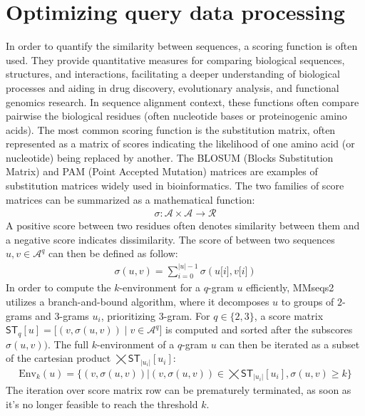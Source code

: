 \documentclass[twoside,a4paper,bsc]{master}
\newcommand{\Qgram}[1]{\(#1\)-gram}
\newcommand{\Subchar}[2]{#1\lbrack #2\rbrack}
\newcommand{\Scoretablename}[0]{\mathsf{ST}}
\newcommand{\Scoretable}[2]{\Scoretablename_{#1}[#2]}
\newcommand{\Alpha}[0]{\mathcal{A}}
\begin{document}
\section{Optimizing query data processing}
In order to quantify the similarity between sequences, a scoring function
is often used. They provide quantitative measures for comparing biological
sequences, structures, and interactions, facilitating a deeper
understanding of biological processes and aiding in drug discovery,
evolutionary analysis, and functional genomics research. In sequence
alignment context, these functions often compare pairwise the biological
residues (often nucleotide bases or proteinogenic amino acids). The most
common scoring function is the substitution matrix, often represented as a
matrix of scores indicating the likelihood of one amino acid (or
nucleotide) being replaced by another. The BLOSUM (Blocks Substitution
Matrix) and PAM (Point Accepted Mutation) matrices are examples of
substitution matrices widely used in bioinformatics. The two families of
score matrices can be summarized as a mathematical function:
\begin{align}
\sigma: \mathcal{A} \times \mathcal{A} \rightarrow \mathcal{R}
\end{align}
A positive score between two residues often denotes similarity between them
and a negative score indicates dissimilarity. The score of between two
sequences \(u,v\in \mathcal{A}^q\) can then be defined as follow:
\begin{align}
\sigma(u,v)=\sum_{i=0}^{|u|-1}\sigma(\Subchar{u}{i},\Subchar{v}{i})\label{equation:sequenceScore}
\end{align}
In order to compute the \(k\)-environment for a \Qgram{q} \(u\)
efficiently, MMseqs2 utilizes a branch-and-bound algorithm, where it
decomposes \(u\) to groups of \Qgram{2}s and \Qgram{3}s \(u_i\),
prioritizing \Qgram{3}. For \(q\in \{2,3\}\), a score matrix
\(\Scoretable{q}{u}=\lbrack (v,\sigma(u,v))\mid v\in\Alpha^{q}\rbrack\) is
computed and sorted after the subscores \(\sigma(u,v))\).
The full $k$-environment of a \Qgram{q} \(u\) can then be iterated as a
subset of the cartesian product \(\bigtimes \Scoretable{|u_i|}{u_i}\):
\begin{align}
\text{Env}_k(u) = \{(v,\sigma(u,v))|(v,\sigma(u,v))\in \bigtimes
\Scoretable{|u_i|}{u_i},\sigma(u,v)\geq k\}\label{ScoreTablesCartesian}
\end{align}
The iteration over score matrix row can be prematurely terminated, as soon
as it's no longer feasible to reach the threshold \(k\).
\end{document}
